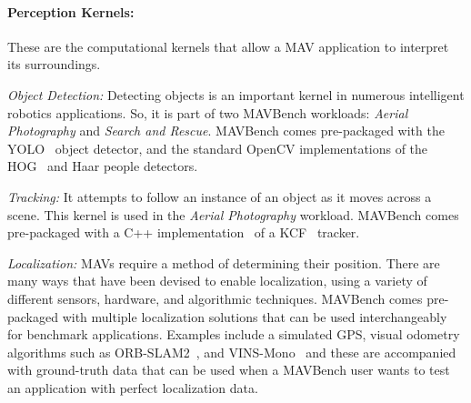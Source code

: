\paragraph{Perception Kernels:} These are the computational kernels that allow a MAV application to interpret its surroundings.

\textit{Object Detection:} Detecting objects is an important kernel in numerous intelligent robotics applications. So, it is part of two MAVBench workloads: \textit{Aerial Photography} and \textit{Search and Rescue}. MAVBench comes pre-packaged with the YOLO~\cite{yolo16} object detector, and the standard OpenCV implementations of the HOG~\cite{hog} and Haar people detectors.

\textit{Tracking:}
It attempts to follow an instance of an object as it moves across a scene. 
This kernel is used in the \textit{Aerial Photography} workload. MAVBench comes pre-packaged with a C++ implementation~\cite{kcf-c++} of a KCF~\cite{kcf} tracker.

\textit{Localization:} MAVs require a method of determining their position. There are many ways that have been devised to enable localization, using a variety of different sensors, hardware, and algorithmic techniques. MAVBench comes pre-packaged with multiple localization solutions that can be used interchangeably for benchmark applications. Examples include a simulated GPS, visual odometry algorithms such as ORB-SLAM2~\cite{orbslam2}, and VINS-Mono~\cite{vins-mono} and these are accompanied with ground-truth data that can be used when a MAVBench user wants to test an application with perfect localization data.


